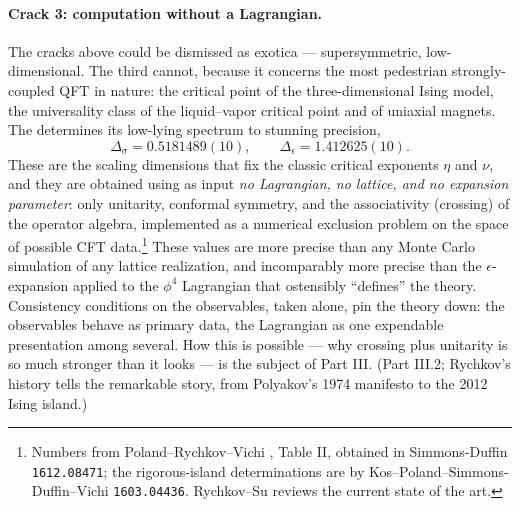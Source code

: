 \paragraph{Crack 3: computation without a Lagrangian.}
The cracks above could be dismissed as exotica --- supersymmetric,
low-dimensional. The third cannot, because it concerns the most pedestrian
strongly-coupled QFT in nature: the critical point of the three-dimensional
Ising model, the universality class of the liquid--vapor critical point and of
uniaxial magnets. The  determines its low-lying
spectrum to stunning precision,
\begin{equation}
\Delta_\sigma = 0.5181489(10), \qquad \Delta_\epsilon = 1.412625(10).
\label{eq:ising-dims}
\end{equation}
These are the scaling dimensions that fix the classic critical exponents $\eta$
and $\nu$, and they are obtained using as input \emph{no Lagrangian, no lattice,
and no expansion parameter}: only unitarity, conformal symmetry, and the
associativity (crossing) of the operator algebra, implemented as a numerical
exclusion problem on the space of possible CFT data.\footnote{Numbers from
Poland--Rychkov--Vichi , Table II, obtained in Simmons-Duffin
\texttt{1612.08471}; the rigorous-island determinations are by
Kos--Poland--Simmons-Duffin--Vichi \texttt{1603.04436}. Rychkov--Su
 reviews the current state of the art.} These values are more
precise than any Monte Carlo simulation of any lattice realization, and
incomparably more precise than the $\epsilon$-expansion applied to the $\phi^4$
Lagrangian that ostensibly ``defines'' the theory. Consistency conditions on the
observables, taken alone, pin the theory down: the observables behave as primary
data, the Lagrangian as one expendable presentation among several. How this is
possible --- why crossing plus unitarity is so much stronger than it looks ---
is the subject of Part III. (Part III.2; Rychkov's history 
tells the remarkable story, from Polyakov's 1974 manifesto to the 2012 Ising
island.)

